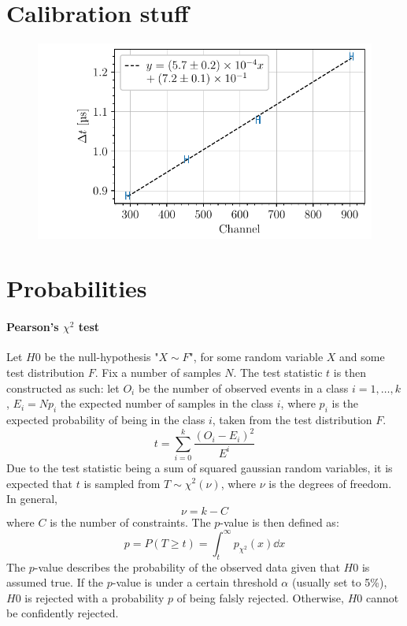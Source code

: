 \section{Calibration stuff}
\begin{figure}[htbp]
    \centering
    \includegraphics[scale=1]{figures/calibration_time_interval.pdf}
    \caption{}
    \label{fig:calibration_time_interval}
\end{figure}

\section{Probabilities}
\label{sec:pearson}

\paragraph{Pearson's \(\chi^2\) test}
Let \(H0\) be the null-hypothesis "\(X \sim F\)", for some random variable \(X\) and some test distribution \(F\). Fix a number of samples \(N\).
The test statistic \(t\) is then constructed as such: let \(O_i\) be the number of observed events in a class \(i=1,\dots,k\), \(E_i = Np_i\) the expected number of samples in the class \(i\), where \(p_i\) is the expected probability of being in the class \(i\), taken from the test distribution \(F\).
\begin{equation}
    t = \sum_{i=0}^k \frac{(O_i - E_i)^2}{E^i}
\end{equation}
Due to the test statistic being a sum of squared gaussian random variables, it is expected that \(t\) is sampled from \(T \sim \chi^2(\nu)\), where \(\nu\) is the degrees of freedom. In general,
\begin{equation}
    \nu = k-C
\end{equation} 
where \(C\) is the number of constraints. The \(p\)-value is then defined as:
\begin{equation}
    p = P(T \ge t) = \int_t^\infty p_{\chi^2}(x) \dd x
\end{equation}
The \(p\)-value describes the probability of the observed data given that \(H0\) is assumed true. If the \(p\)-value is under a certain threshold \(\alpha\) (usually set to 5\%), \(H0\) is rejected with a probability \(p\) of being falsly rejected. Otherwise, \(H0\) cannot be confidently rejected.